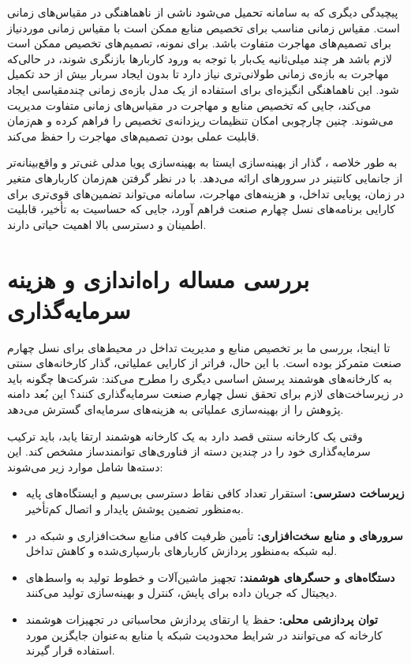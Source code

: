 پیچیدگی دیگری که به سامانه تحمیل می‌شود ناشی از ناهماهنگی در مقیاس‌های زمانی است. مقیاس زمانی مناسب برای تخصیص منابع ممکن است با مقیاس زمانی موردنیاز برای تصمیم‌های مهاجرت متفاوت باشد. برای نمونه، تصمیم‌های تخصیص ممکن است لازم باشد هر چند میلی‌ثانیه یک‌بار با توجه به ورود کاربارها بازنگری شوند، در حالی‌که مهاجرت به بازه‌ی زمانی طولانی‌تری نیاز دارد تا بدون ایجاد سربار بیش از حد تکمیل شود. این ناهماهنگی انگیزه‌ای برای استفاده از یک مدل بازه‌ی زمانی چندمقیاسی ایجاد می‌کند، جایی که تخصیص منابع و مهاجرت در مقیاس‌های زمانی متفاوت مدیریت می‌شوند. چنین چارچوبی امکان تنظیمات ریزدانه‌ی تخصیص را فراهم کرده و هم‌زمان قابلیت عملی بودن تصمیم‌های مهاجرت را حفظ می‌کند.

به طور خلاصه ، گذار از بهینه‌سازی ایستا به بهینه‌سازی پویا مدلی غنی‌تر و واقع‌بینانه‌تر از جانمایی کانتینر در سرورهای  ارائه می‌دهد. با در نظر گرفتن هم‌زمان کاربارهای متغیر در زمان، پویایی تداخل، و هزینه‌های مهاجرت، سامانه می‌تواند تضمین‌های قوی‌تری برای کارایی برنامه‌های نسل چهارم صنعت فراهم آورد، جایی که حساسیت به تأخیر، قابلیت اطمینان و دسترسی بالا اهمیت حیاتی دارند. 

\section{بررسی مساله راه‌اندازی و هزینه سرمایه‌گذاری}

تا اینجا، بررسی ما بر تخصیص منابع و مدیریت تداخل در محیط‌های  برای نسل چهارم صنعت متمرکز بوده است. با این حال، فراتر از کارایی عملیاتی، گذار کارخانه‌های سنتی به کارخانه‌های هوشمند پرسش اساسی دیگری را مطرح می‌کند: شرکت‌ها چگونه باید در زیرساخت‌های لازم برای تحقق نسل چهارم صنعت سرمایه‌گذاری کنند؟ این بُعد دامنه پژوهش را از بهینه‌سازی عملیاتی  به هزینه‌های سرمایه‌ای  گسترش می‌دهد.

وقتی یک کارخانه سنتی قصد دارد به یک کارخانه هوشمند ارتقا یابد، باید ترکیب سرمایه‌گذاری خود را در چندین دسته از فناوری‌های توانمندساز مشخص کند. این دسته‌ها شامل موارد زیر می‌شوند:

\begin{itemize}
\item
\textbf{زیرساخت دسترسی:} استقرار تعداد کافی نقاط دسترسی بی‌سیم و ایستگاه‌های پایه به‌منظور تضمین پوشش پایدار و اتصال کم‌تأخیر.

\item
\textbf{سرورهای  و منابع سخت‌افزاری:} تأمین ظرفیت کافی منابع سخت‌افزاری و شبکه در لبه شبکه به‌منظور پردازش کاربارهای بار‌سپاری‌شده و کاهش تداخل.

\item
\textbf{دستگاه‌های  و حسگرهای هوشمند:} تجهیز ماشین‌آلات و خطوط تولید به واسط‌های دیجیتال که جریان داده برای پایش، کنترل و بهینه‌سازی تولید می‌کنند.

\item
\textbf{توان پردازشی محلی:} حفظ یا ارتقای پردازش محاسباتی در تجهیزات هوشمند کارخانه که می‌توانند در شرایط محدودیت شبکه یا منابع  به‌عنوان جایگزین مورد استفاده قرار گیرند.
\end{itemize}

